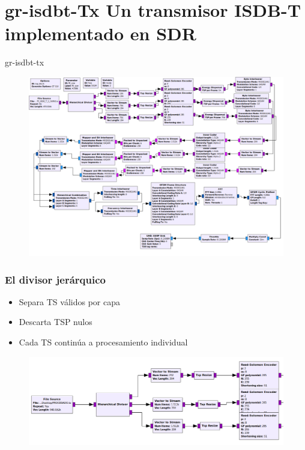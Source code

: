 \section{gr-isdbt-Tx Un transmisor ISDB-T implementado en SDR}

\begin{frame}{gr-isdbt-tx}
\begin{figure}
	\includegraphics[scale=0.20]{flowgraphEdited}
\end{figure}
\end{frame}

\begin{frame}
\frametitle{El divisor jerárquico}
	\begin{itemize}	
		\item { Separa TS válidos por capa}
		\item {	Descarta TSP nulos }
		\item { Cada TS continúa a procesamiento individual }
	\end{itemize}
	\begin{figure}
		\includegraphics[scale=0.25]{h_div}
	\end{figure}
\end{frame}

